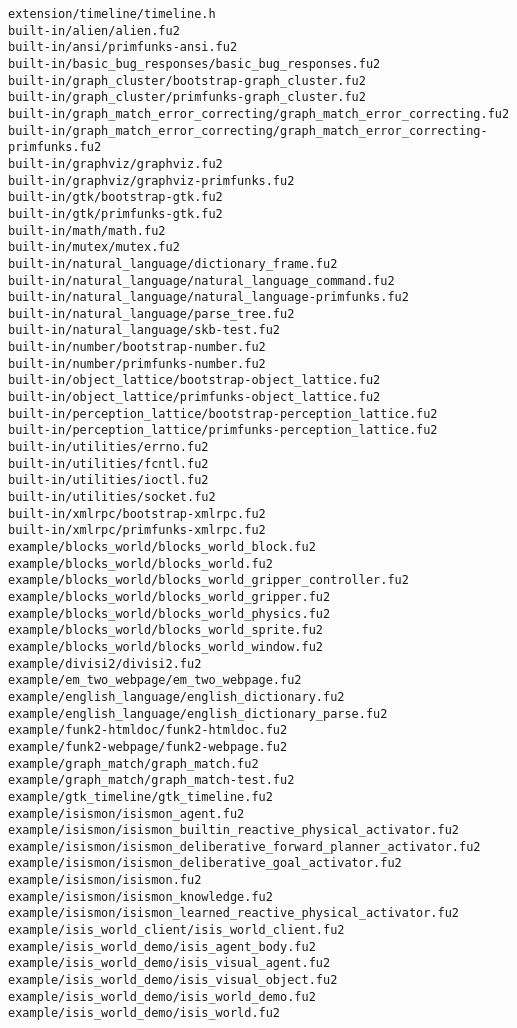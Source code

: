 \begin{lstlisting}
extension/timeline/timeline.h
built-in/alien/alien.fu2
built-in/ansi/primfunks-ansi.fu2
built-in/basic_bug_responses/basic_bug_responses.fu2
built-in/graph_cluster/bootstrap-graph_cluster.fu2
built-in/graph_cluster/primfunks-graph_cluster.fu2
built-in/graph_match_error_correcting/graph_match_error_correcting.fu2
built-in/graph_match_error_correcting/graph_match_error_correcting-primfunks.fu2
built-in/graphviz/graphviz.fu2
built-in/graphviz/graphviz-primfunks.fu2
built-in/gtk/bootstrap-gtk.fu2
built-in/gtk/primfunks-gtk.fu2
built-in/math/math.fu2
built-in/mutex/mutex.fu2
built-in/natural_language/dictionary_frame.fu2
built-in/natural_language/natural_language_command.fu2
built-in/natural_language/natural_language-primfunks.fu2
built-in/natural_language/parse_tree.fu2
built-in/natural_language/skb-test.fu2
built-in/number/bootstrap-number.fu2
built-in/number/primfunks-number.fu2
built-in/object_lattice/bootstrap-object_lattice.fu2
built-in/object_lattice/primfunks-object_lattice.fu2
built-in/perception_lattice/bootstrap-perception_lattice.fu2
built-in/perception_lattice/primfunks-perception_lattice.fu2
built-in/utilities/errno.fu2
built-in/utilities/fcntl.fu2
built-in/utilities/ioctl.fu2
built-in/utilities/socket.fu2
built-in/xmlrpc/bootstrap-xmlrpc.fu2
built-in/xmlrpc/primfunks-xmlrpc.fu2
example/blocks_world/blocks_world_block.fu2
example/blocks_world/blocks_world.fu2
example/blocks_world/blocks_world_gripper_controller.fu2
example/blocks_world/blocks_world_gripper.fu2
example/blocks_world/blocks_world_physics.fu2
example/blocks_world/blocks_world_sprite.fu2
example/blocks_world/blocks_world_window.fu2
example/divisi2/divisi2.fu2
example/em_two_webpage/em_two_webpage.fu2
example/english_language/english_dictionary.fu2
example/english_language/english_dictionary_parse.fu2
example/funk2-htmldoc/funk2-htmldoc.fu2
example/funk2-webpage/funk2-webpage.fu2
example/graph_match/graph_match.fu2
example/graph_match/graph_match-test.fu2
example/gtk_timeline/gtk_timeline.fu2
example/isismon/isismon_agent.fu2
example/isismon/isismon_builtin_reactive_physical_activator.fu2
example/isismon/isismon_deliberative_forward_planner_activator.fu2
example/isismon/isismon_deliberative_goal_activator.fu2
example/isismon/isismon.fu2
example/isismon/isismon_knowledge.fu2
example/isismon/isismon_learned_reactive_physical_activator.fu2
example/isis_world_client/isis_world_client.fu2
example/isis_world_demo/isis_agent_body.fu2
example/isis_world_demo/isis_visual_agent.fu2
example/isis_world_demo/isis_visual_object.fu2
example/isis_world_demo/isis_world_demo.fu2
example/isis_world_demo/isis_world.fu2

\end{lstlisting}
